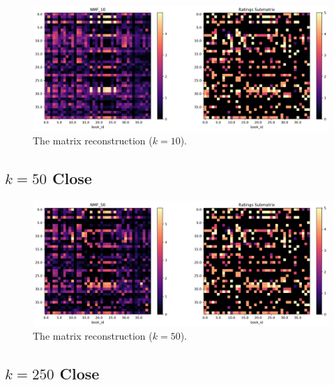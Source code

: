 \documentclass[handout]{beamer}
\begin{document}
\begin{frame}
 \begin{figure}[t]
    \includegraphics[width=\linewidth]{../image/goodreads-models/nmf-10-left-close.png}
    \caption[NMF-10-left-close]{The matrix reconstruction ($k=10$).}
     \label{fig:nmf-10-left-close}
\end{figure}
\end{frame}

\subsection{$k=50$ Close}\label{k-50-close}

\begin{frame}
 \begin{figure}[t]
    \includegraphics[width=\linewidth]{../image/goodreads-models/nmf-50-left-close.png}
    \caption[NMF-50-left-close]{The matrix reconstruction ($k=50$).}
     \label{fig:nmf-50-left-close}
\end{figure}
\end{frame}

\subsection{$k=250$ Close}\label{k-250-close}
\end{document}
